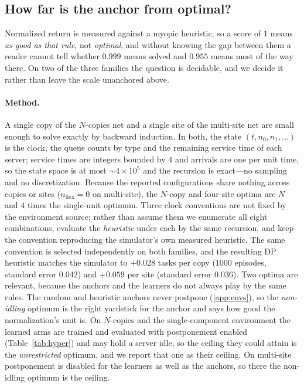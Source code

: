 \documentclass[review,authoryear,3p,times]{elsarticle}
\begin{document}
\subsection{How far is the anchor from optimal?}
\label{sec:optimum}

Normalized return is measured against a myopic heuristic, so a score of $1$
means \emph{as good as that rule}, not \emph{optimal}, and without knowing the
gap between them a reader cannot tell whether $0.999$ means solved and $0.955$
means most of the way there. On two of the three families the question is
decidable, and we decide it rather than leave the scale unanchored above.

\paragraph{Method.} A single copy of the $N$-copies net and a single site of
the multi-site net are small enough to solve exactly by backward induction. In
both, the state $(t,n_0,n_1,\dots)$ is the clock, the queue counts by type and
the remaining service time of each server; service times are integers bounded
by $4$ and arrivals are one per unit time, so the state space is at most
$\sim\!4\times10^{5}$ and the recursion is exact---no sampling and no
discretization. Because the reported configurations share nothing across copies
or sites ($n_{\mathrm{flex}}=0$ on multi-site), the $N$-copy and four-site
optima are $N$ and $4$ times the single-unit optimum. Three clock conventions
are not fixed by the environment source; rather than assume them we enumerate
all eight combinations, evaluate the \emph{heuristic} under each by the same
recursion, and keep the convention reproducing the simulator's own measured
heuristic. The same convention is selected independently on both families, and
the resulting DP heuristic matches the simulator to $+0.028$ tasks per copy
($1000$ episodes, standard error $0.042$) and $+0.059$ per site (standard error
$0.036$). Two optima are relevant, because the anchors and the learners do not
always play by the same rules. The random and heuristic anchors never postpone
(\ref{app:envs}), so the \emph{non-idling} optimum is the right
yardstick for the anchor and says how good the normalization's unit is. On
$N$-copies and the single-component environment the learned arms are trained
and evaluated with postponement enabled (Table~\ref{tab:hyper}) and may hold a
server idle, so the ceiling they could attain is the \emph{unrestricted}
optimum, and we report that one as their ceiling. On multi-site postponement is
disabled for the learners as well as the anchors, so there the non-idling
optimum is the ceiling.
\end{document}

